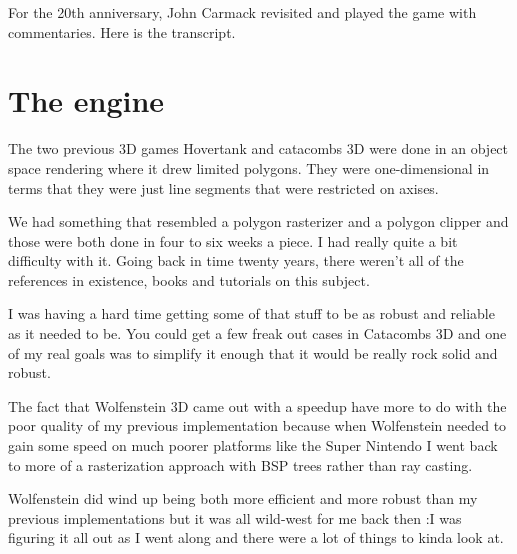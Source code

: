 \documentclass[book.tex]{subfiles}
\begin{document}
For the 20th anniversary, John Carmack revisited and played the game with commentaries. Here is the transcript.


   
\section{The engine}

The two previous 3D games Hovertank and catacombs 3D were done in an object space rendering where it drew limited polygons. They were one-dimensional in terms that they were just line segments that were restricted on axises.\\
\par
We had something that resembled a polygon rasterizer and a polygon clipper and those were both done in four to six weeks a piece. I had really quite a bit difficulty with it. Going back in time twenty years, there weren't all of the references in existence, books and tutorials on this subject.\\
\par
I was having a hard time getting some of that stuff to be as robust
and reliable as it needed to be. You could get a few freak out cases
in Catacombs 3D and one of my real goals was to simplify it enough
that it would be really rock solid and robust.\\
\par

The fact that Wolfenstein 3D came out with a speedup have more to do with the poor quality of my previous implementation because when Wolfenstein  needed to gain some speed on much poorer platforms like the Super Nintendo I went back to more of a rasterization approach with BSP trees rather than ray casting.\\
\par

Wolfenstein did wind up being both more efficient and more robust than my previous implementations but it was all wild-west for me back then :I was figuring it  all out as I went along and there were a lot of things to kinda look at.\\
\par
\end{document}
